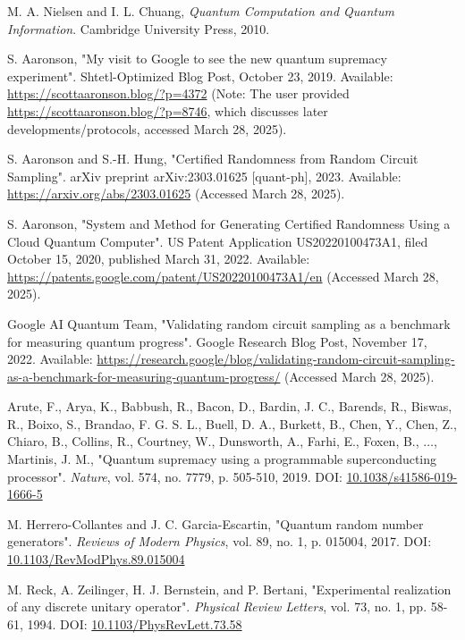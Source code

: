 \documentclass[11pt, a4paper]{article}
\begin{document}
\begin{thebibliography}{9}

M. A. Nielsen and I. L. Chuang,
\textit{Quantum Computation and Quantum Information}.
Cambridge University Press, 2010.

S. Aaronson,
"My visit to Google to see the new quantum supremacy experiment".
Shtetl-Optimized Blog Post, October 23, 2019. Available:
\url{https://scottaaronson.blog/?p=4372} (Note: The user provided \url{https://scottaaronson.blog/?p=8746}, which discusses later developments/protocols, accessed March 28, 2025).

S. Aaronson and S.-H. Hung,
"Certified Randomness from Random Circuit Sampling".
arXiv preprint arXiv:2303.01625 [quant-ph], 2023. Available:
\url{https://arxiv.org/abs/2303.01625} (Accessed March 28, 2025).

S. Aaronson,
"System and Method for Generating Certified Randomness Using a Cloud Quantum Computer".
US Patent Application US20220100473A1, filed October 15, 2020, published March 31, 2022. Available:
\url{https://patents.google.com/patent/US20220100473A1/en} (Accessed March 28, 2025).

Google AI Quantum Team,
"Validating random circuit sampling as a benchmark for measuring quantum progress".
Google Research Blog Post, November 17, 2022. Available:
\url{https://research.google/blog/validating-random-circuit-sampling-as-a-benchmark-for-measuring-quantum-progress/} (Accessed March 28, 2025).

{Arute, F., Arya, K., Babbush, R., Bacon, D., Bardin, J. C., Barends, R., Biswas, R., Boixo, S., Brandao, F. G. S. L., Buell, D. A., Burkett, B., Chen, Y., Chen, Z., Chiaro, B., Collins, R., Courtney, W., Dunsworth, A., Farhi, E., Foxen, B., $\ldots$, Martinis, J. M.},
"Quantum supremacy using a programmable superconducting processor".
\textit{Nature}, vol. 574, no. 7779, p. 505-510, 2019.
DOI: \href{https://doi.org/10.1038/s41586-019-1666-5}{10.1038/s41586-019-1666-5}

M. Herrero-Collantes and J. C. Garcia-Escartin,
"Quantum random number generators".
\textit{Reviews of Modern Physics}, vol. 89, no. 1, p. 015004, 2017.
DOI: \href{https://doi.org/10.1103/RevModPhys.89.015004}{10.1103/RevModPhys.89.015004}

M. Reck, A. Zeilinger, H. J. Bernstein, and P. Bertani,
"Experimental realization of any discrete unitary operator".
\textit{Physical Review Letters}, vol. 73, no. 1, pp. 58-61, 1994.
DOI: \href{https://doi.org/10.1103/PhysRevLett.73.58}{10.1103/PhysRevLett.73.58}


\end{thebibliography}
\end{document}
